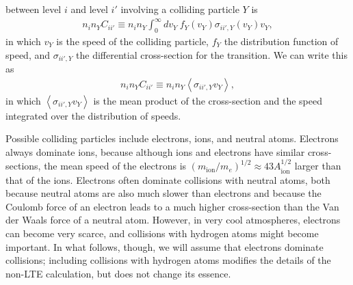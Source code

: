 between level $i$ and level $i'$ involving a colliding particle $Y$ is
\begin{align}
n_i n_Y C_{ii'} \equiv n_i n_Y \int_0^\infty\!\!\!dv_Y\: f_Y(v_Y) \sigma_{ii',Y}(v_Y) v_Y,
\end{align}
in which $v_Y$ is the speed of the colliding particle, $f_Y$ the
distribution function of speed, and $\sigma_{ii',Y}$ the differential
cross-section for the transition. We can write this as
\begin{align}
n_i n_Y C_{ii'} \equiv n_i n_Y \left<\sigma_{ii',Y} v_Y\right>,
\end{align}
in which $\left<\sigma_{ii',Y} v_Y\right>$ is the mean product of the
cross-section and the speed integrated over the distribution of speeds.

Possible colliding particles include electrons, ions, and neutral atoms.
Electrons always dominate ions, because although ions and electrons have
similar cross-sections, the mean speed of the electrons is
$(m_\mathrm{ion}/m_e)^{1/2} \approx 43 A_\mathrm{ion}^{1/2}$ larger than
that of the ions. Electrons often dominate collisions with neutral
atoms, both because neutral atoms are also much slower than electrons
and because the Coulomb force of an electron leads to a much higher
cross-section than the Van der Waals force of a neutral atom. However,
in very cool atmospheres, electrons can become very scarce, and
collisions with hydrogen atoms might become important. In what follows,
though, we will assume that electrons dominate collisions; including
collisions with hydrogen atoms modifies the details of the non-LTE
calculation, but does not change its essence.

